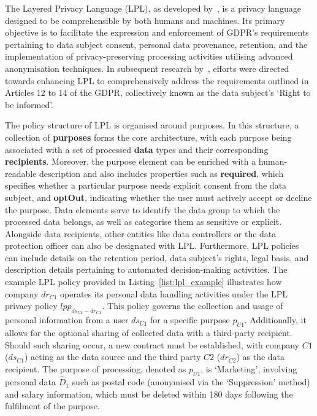 The Layered Privacy Language (LPL), as developed by~\cite{gerl_lpl_2018}, is a privacy language designed to be comprehensible by both humans and machines.
Its primary objective is to facilitate the expression and enforcement of GDPR's requirements pertaining to data subject consent, personal data provenance, retention, and the implementation of privacy-preserving processing activities utilising advanced anonymisation techniques.
In subsequent research by~\cite{gerl_critical_2018}, efforts were directed towards enhancing LPL to comprehensively address the requirements outlined in Articles 12 to 14 of the GDPR, collectively known as the data subject's `Right to be informed'.

The policy structure of LPL is organised around purposes.
In this structure, a collection of \textbf{purposes} forms the core architecture, with each purpose being associated with a set of processed \textbf{data} types and their corresponding \textbf{recipients}.
Moreover, the purpose element can be enriched with a human-readable description and also includes properties such as \textbf{required}, which specifies whether a particular purpose needs explicit consent from the data subject, and \textbf{optOut}, indicating whether the user must actively accept or decline the purpose.
Data elements serve to identify the data group to which the processed data belongs, as well as categorise them as sensitive or explicit.
Alongside data recipients, other entities like data controllers or the data protection officer can also be designated with LPL.
Furthermore, LPL policies can include details on the retention period, data subject's rights, legal basis, and description details pertaining to automated decision-making activities.
The example LPL policy provided in Listing~\ref{list:lpl_example} illustrates how company $dr_{C1}$ operates its personal data handling activities under the LPL privacy policy $lpp_{ds_{U1}-dr_{C1}}$.
This policy governs the collection and usage of personal information from a user $ds_{U1}$ for a specific purpose $p_{U1}$.
Additionally, it allows for the optional sharing of collected data with a third-party recipient.
Should such sharing occur, a new contract must be established, with company $C1$ ($ds_{C1}$) acting as the data source and the third party $C2$ ($dr_{C2}$) as the data recipient.
The purpose of processing, denoted as $p_{U1}$, is `Marketing', involving personal data $\hat{D}_1$ such as postal code (anonymised via the `Suppression' method) and salary information, which must be deleted within 180 days following the fulfilment of the purpose.

